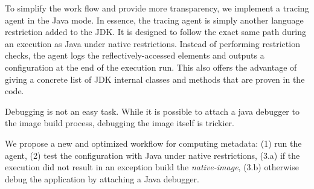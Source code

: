 To simplify the work flow and provide more transparency, we implement a tracing agent in the Java mode. In essence, the tracing agent is simply another language restriction added to the JDK. It is designed to follow the exact same path during an execution as Java under native restrictions. Instead of performing restriction checks, the agent logs the reflectively-accessed elements and outputs a configuration at the end of the execution run.
This also offers the advantage of giving a concrete list of JDK internal classes and methods that are proven in the code.

Debugging is not an easy task. While it is possible to attach a java debugger to the image build process, debugging the image itself is trickier. 

We propose a new and optimized workflow for computing metadata: (1) run the agent, (2) test the configuration with Java under native restrictions, (3.a) if the execution did not result in an exception build the \textit{native-image}, (3.b) otherwise debug the application by attaching a Java debugger.



